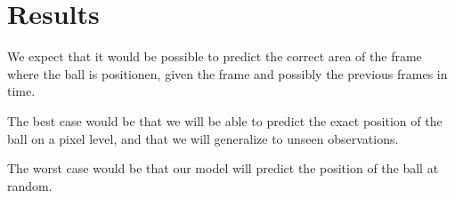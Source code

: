 
\section{Results}

We expect that it would be possible to predict the correct area of the
frame where the ball is positionen, given the frame and possibly the
previous frames in time.

The best case would be that we will be able to predict the exact
position of the ball on a pixel level, and that we will generalize
to unseen observations.

The worst case would be that our model will predict the position of the
ball at random.

